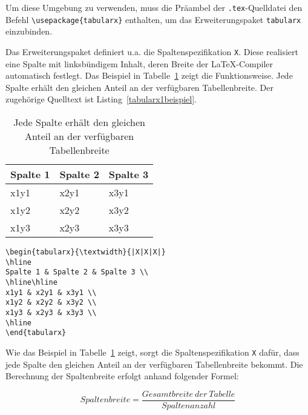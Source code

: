 
Um diese Umgebung zu verwenden, muss die Präambel der \verb!.tex!-Quelldatei den Befehl 
\verb!\usepackage{tabularx}! enthalten, um das Erweiterungspaket \verb!tabularx! einzubinden.

Das Erweiterungspaket definiert u.a. die Spaltenspezifikation \verb!X!. Diese realisiert eine Spalte mit linksbündigem Inhalt, deren Breite der \LaTeX-Compiler automatisch festlegt. Das Beispiel in Tabelle~\ref{Tabelle_tabularx1} zeigt die Funktionsweise. Jede Spalte erhält den gleichen Anteil an der verfügbaren Tabellenbreite. Der zugehörige Quelltext ist Listing~\ref{tabularx1beispiel}. 


\begin{table}[h!tb]
\centering
\caption{Jede Spalte erhält den gleichen Anteil an der verfügbaren Tabellenbreite}
\label{Tabelle_tabularx1}
\begin{tabularx}{\textwidth}{|X|X|X|}
\hline
Spalte 1 & Spalte 2 & Spalte 3 \\
\hline\hline
x1y1 & x2y1 & x3y1 \\
x1y2 & x2y2 & x3y2 \\
x1y3 & x2y3 & x3y3 \\
\hline
\end{tabularx}
\end{table}



\begin{lstlisting}[caption={Eine einfache Tabelle mit der Umgebung \texttt{tabularx}},label=tabularx1beispiel, style=customlatex]
\begin{tabularx}{\textwidth}{|X|X|X|}
\hline
Spalte 1 & Spalte 2 & Spalte 3 \\
\hline\hline
x1y1 & x2y1 & x3y1 \\
x1y2 & x2y2 & x3y2 \\
x1y3 & x2y3 & x3y3 \\
\hline
\end{tabularx}
\end{lstlisting}


Wie das Beispiel in Tabelle~\ref{Tabelle_tabularx1} zeigt, 
sorgt die Spaltenspezifikation \verb!X! 
dafür, dass jede Spalte den gleichen Anteil an der verfügbaren
Tabellenbreite bekommt. Die Berechnung der Spaltenbreite erfolgt anhand folgender 
Formel:

\begin{displaymath}
Spaltenbreite = \frac{Gesamtbreite\ der\ Tabelle}{Spaltenanzahl}
\end{displaymath}


